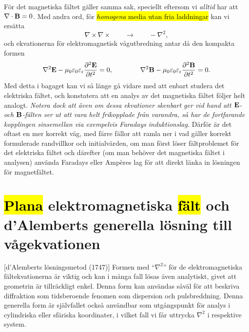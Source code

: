 {{{{{F{\"o}r det magnetiska f{\"a}ltet g{\"a}ller samma sak, speciellt eftersom vi
{\it alltid} har att $\nabla\cdot{\bf B}=0$. Med andra ord, f{\"o}r
{\hl{{\it homogena} media utan fria laddningar}} kan vi ers{\"a}tta
\hl{$$
  \nabla\times\nabla\times\qquad\to\qquad-\nabla^2,
$$}
och ekvationerna f{\"o}r elektromagnetisk v{\aa}gutbredning antar d{\aa} den
kompakta formen
\hl{$$
  \nabla^2{\bf E} - \mu_0\varepsilon_0\varepsilon_{\rm r}
    {{\partial^2{\bf E}}\over{\partial t^2}} = 0,
  \qquad\qquad
  \nabla^2{\bf B} - \mu_0\varepsilon_0\varepsilon_{\rm r}
    {{\partial^2{\bf B}}\over{\partial t^2}} = 0.
$$}
Med detta i bagaget kan vi s{\aa} l{\"a}nge g{\aa} vidare med att enbart
studera det elektriska f{\"a}ltet, och konstatera att en analys av det
magnetiska f{\"a}ltet f{\"o}ljer helt analogt. {\it Notera dock att {\"a}ven om
dessa ekvationer skenbart ger vid hand att ${\bf E}$- och ${\bf B}$-f{\"a}lten
ser ut att vara helt frikopplade fr{\aa}n varandra, s{\aa} har de fortfarande
kopplingen sinsemellan via exempelvis Faradays induktionslag.} D{\"a}rf{\"o}r
{\"a}r det oftast en mer korrekt v{\"a}g, med f{\"a}rre f{\"a}llor att ramla
ner i vad g{\"a}ller korrekt formulerade randvillkor och initialv{\"a}rden,
om man f{\"o}rst l{\"o}ser f{\"a}ltproblemet f{\"o}r det elektriska f{\"a}ltet
och d{\"a}refter (om man beh{\"o}ver det magnetiska f{\"a}ltet i analysen)
anv{\"a}nda Faradays eller Amp\`eres lag f{\"o}r att direkt l{\"a}nka in
l{\"o}sningen f{\"o}r magnetf{\"a}ltet.

\section{{\hl{Plana}} elektromagnetiska {\hl{f{\"a}lt}} och d'Alemberts
  generella l{\"o}sning till v{\aa}gekvationen}
[d'Alemberts l{\"o}sningsmetod
  (1747)]
Formen med ``$\nabla^2$'' f{\"o}r de elektromagnetiska f{\"a}ltekvationerna
{\"a}r viktig och kan i m{\aa}nga fall l{\"o}sas {\"a}ven analytiskt, givet
att geometrin {\"a}r tillr{\"a}ckligt enkel. Denna form kan anv{\"a}ndas
s{\aa}v{\"a}l f{\"o}r att beskriva diffraktion som tidsberoende fenomen som
dispersion och pulsbreddning. Denna generella form {\"a}r sj{\"a}lvfallet
ocks{\aa} anv{\"a}ndbar som utg{\aa}ngspunkt f{\"o}r analys i cylindriska
eller sf{\"a}riska koordinater, i vilket fall vi f{\aa}r uttrycka $\nabla^2$
i respektive system.

}}}}}
